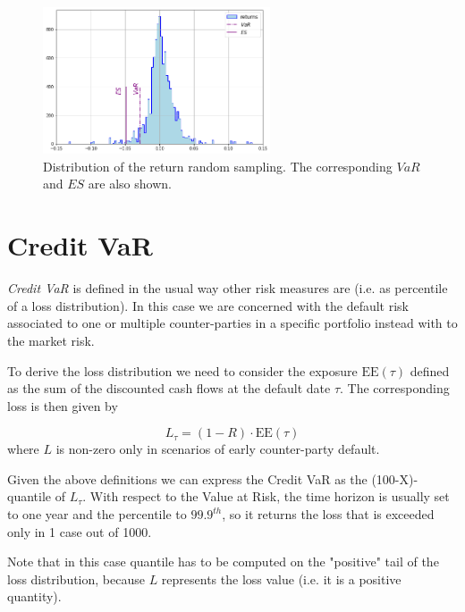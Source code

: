 \begin{figure}[htb]
\centering
\includegraphics[width=0.6\textwidth]{figures/historical_var}
\caption{Distribution of the return random sampling. The corresponding $VaR$ and $ES$ are also shown.}
\label{fig:historical_var}
\end{figure}

\section{Credit VaR}
\label{credit-var-cr-var}


\emph{Credit VaR} is defined in the usual way other risk measures are (i.e. as percentile of a loss distribution). In this case we are concerned with the default risk associated to one or multiple counter-parties in a specific portfolio instead with to the market risk.

To derive the loss distribution we need to consider the exposure $\text{EE}(\tau)$ defined as the sum of the discounted cash flows at the default date $\tau$. The corresponding loss is then given by

\begin{equation}
L_{\tau} = (1 - R) \cdot \textrm{EE}(\tau)
\end{equation}
where $L$ is non-zero only in scenarios of early counter-party default. 

Given the above definitions we can express the Credit VaR as the (100-X)-quantile of $L_{\tau}$. With respect to the Value at Risk, the time horizon is usually set to one year and the percentile to $99.9^{th}$, so it returns the loss that is exceeded only in 1 case out of 1000. 

Note that in this case quantile has to be computed on the "positive" tail of the loss distribution, because $L$ represents the loss value (i.e. it is a positive quantity).

